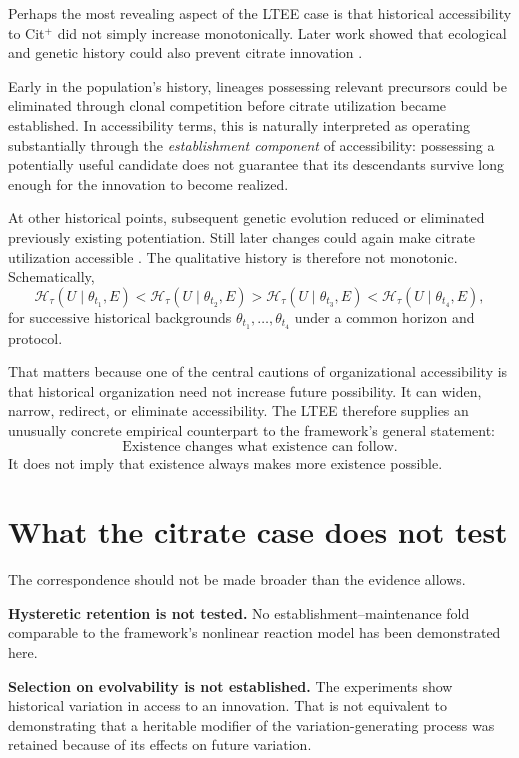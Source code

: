 \documentclass[11pt]{article}
\begin{document}
Perhaps the most revealing aspect of the LTEE case is that historical accessibility to Cit$^{+}$ did not simply increase monotonically. Later work showed that ecological and genetic history could also prevent citrate innovation \cite{Leon2018}.

Early in the population's history, lineages possessing relevant precursors could be eliminated through clonal competition before citrate utilization became established. In accessibility terms, this is naturally interpreted as operating substantially through the \emph{establishment component} of accessibility: possessing a potentially useful candidate does not guarantee that its descendants survive long enough for the innovation to become realized.

At other historical points, subsequent genetic evolution reduced or eliminated previously existing potentiation. Still later changes could again make citrate utilization accessible \cite{Leon2018}. The qualitative history is therefore not monotonic. Schematically,
\[
\mathcal H_{\tau}(U\mid\theta_{t_1},E)
<
\mathcal H_{\tau}(U\mid\theta_{t_2},E)
>
\mathcal H_{\tau}(U\mid\theta_{t_3},E)
<
\mathcal H_{\tau}(U\mid\theta_{t_4},E),
\]
for successive historical backgrounds $\theta_{t_1},\dots,\theta_{t_4}$ under a common horizon and protocol.

That matters because one of the central cautions of organizational accessibility is that historical organization need not increase future possibility. It can widen, narrow, redirect, or eliminate accessibility. The LTEE therefore supplies an unusually concrete empirical counterpart to the framework's general statement:
\[
\boxed{\text{Existence changes what existence can follow.}}
\]
It does not imply that existence always makes more existence possible.

\section{What the citrate case does not test}

The correspondence should not be made broader than the evidence allows.

\textbf{Hysteretic retention is not tested.} No establishment--maintenance fold comparable to the framework's nonlinear reaction model has been demonstrated here.

\textbf{Selection on evolvability is not established.} The experiments show historical variation in access to an innovation. That is not equivalent to demonstrating that a heritable modifier of the variation-generating process was retained because of its effects on future variation.
\end{document}
